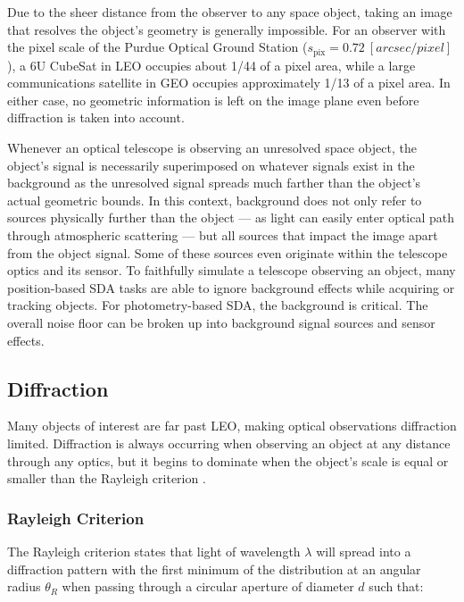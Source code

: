 Due to the sheer distance from the observer to any space object, taking an image that resolves the object's geometry is generally impossible. For an observer with the pixel scale of the Purdue Optical Ground Station ($s_\mathrm{pix} = 0.72 \: [arcsec/pixel]$), a 6U CubeSat in LEO occupies about 1/44 of a pixel area, while a large communications satellite in GEO occupies approximately 1/13 of a pixel area. In either case, no geometric information is left on the image plane even before diffraction is taken into account. 

Whenever an optical telescope is observing an unresolved space object, the object's signal is necessarily superimposed on whatever signals exist in the background as the unresolved signal spreads much farther than the object's actual geometric bounds. In this context, background does not only refer to sources physically further than the object --- as light can easily enter optical path through atmospheric scattering --- but all sources that impact the image apart from the object signal. Some of these sources even originate within the telescope optics and its sensor. To faithfully simulate a telescope observing an object, many position-based SDA tasks are able to ignore background effects while acquiring or tracking objects. For photometry-based SDA, the background is critical. The overall noise floor can be broken up into background signal sources and sensor effects.

\subsection{Diffraction}

Many objects of interest are far past LEO, making optical observations diffraction limited. Diffraction is always occurring when observing an object at any distance through any optics, but it begins to dominate when the object's scale is equal or smaller than the Rayleigh criterion \cite{frueh2019notes}.

\subsubsection{Rayleigh Criterion}

The Rayleigh criterion states that light of wavelength $\lambda$ will spread into a diffraction pattern with the first minimum of the distribution at an angular radius $\theta_R$ when passing through a circular aperture of diameter $d$ \cite{frueh2019notes} such that:

